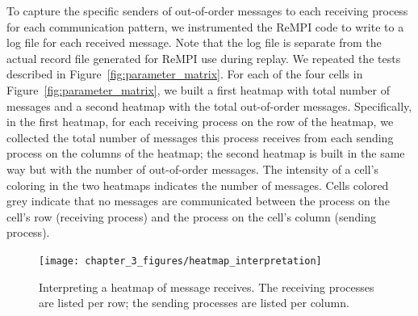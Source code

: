 To capture the specific senders of out-of-order messages to each
receiving process for each communication pattern, we instrumented the
ReMPI code to write to a log file for each received message. Note that
the log file is separate from the actual record file generated for
ReMPI use during replay. We repeated the tests described in
Figure~\ref{fig:parameter_matrix}. For each of the four cells in
Figure~\ref{fig:parameter_matrix}, we built a first heatmap with total
number of messages and a second heatmap with the total out-of-order
messages.  Specifically, in the first heatmap, for each receiving
process on the row of the heatmap, we collected the total number of
messages this process receives from each sending process on the
columns of the heatmap; the second heatmap is built in the same way
but with the number of out-of-order messages. The intensity of a
cell's coloring in the two heatmaps indicates the number of
messages. Cells colored grey indicate that no messages are
communicated between the process on the cell's row (receiving process)
and the process on the cell's column (sending process).
\begin{figure}[!htb]
    \centering
    \texttt{[image: chapter\_3\_figures/heatmap\_interpretation]}
    \caption{Interpreting a heatmap of message receives. The receiving
      processes are listed per row; the sending processes are listed
      per column.}
    \label{fig:heatmap_interpretation}
\end{figure}


